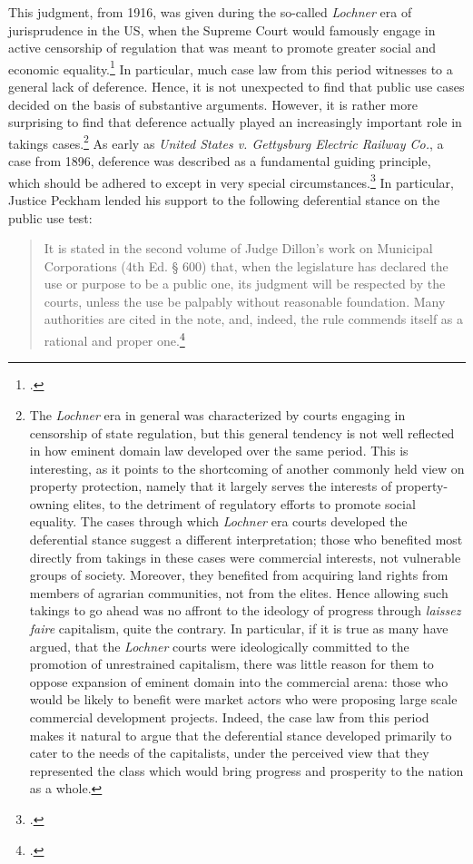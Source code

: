 This judgment, from 1916, was given during the so-called {\it Lochner} era of jurisprudence in the US, when the Supreme Court  would famously engage in active censorship of regulation that was meant to promote greater social and economic equality.\footcite{cohen08} In particular, much case law from this period witnesses to a general lack of deference. Hence, it is not unexpected to find that public use cases decided on the basis of substantive arguments. However, it is rather more surprising to find that deference actually played an increasingly important role in takings cases.\footnote{The {\it Lochner} era in general was characterized by courts engaging in censorship of state regulation, but this general tendency is not well reflected in how eminent domain law developed over the same period. This is interesting, as it points to the shortcoming of another commonly held view on property protection, namely that it largely serves the interests of property-owning elites, to the detriment of regulatory efforts to promote social equality. The cases through which {\it Lochner} era courts developed the deferential stance suggest a different interpretation; those who benefited most directly from takings in these cases were commercial interests, not vulnerable groups of society. Moreover, they benefited from acquiring land rights from members of agrarian communities, not from the elites. Hence allowing such takings to go ahead was no affront to the ideology of progress through {\it laissez faire} capitalism, quite the contrary. In particular, if it is true as many have argued, that the {\it Lochner} courts were ideologically committed to the promotion of unrestrained capitalism, there was little reason for them to oppose expansion of eminent domain into the commercial arena: those who would be likely to benefit were market actors who were proposing large scale commercial development projects. Indeed, the case law from this period makes it natural to argue that the deferential stance developed primarily to cater to the needs of the capitalists, under the perceived view that they represented the class which would bring progress and prosperity to the nation as a whole.} As early as { \it United States v. Gettysburg Electric Railway Co.}, a case from 1896, deference was described as a fundamental guiding principle, which should be adhered to except in very special circumstances.\footcite{gettysburg96} In particular, Justice Peckham lended his support to the following deferential stance on the public use test:

\begin{quote}
It is stated in the second volume of Judge Dillon's work on Municipal Corporations (4th Ed. § 600) that, when the legislature has declared the use or purpose to be a public one, its judgment will be respected by the courts, unless the use be palpably without reasonable foundation. Many authorities are cited in the note, and, indeed, the rule commends itself as a rational and proper one.\footcite[680]{gettysburg96}
\end{quote}

